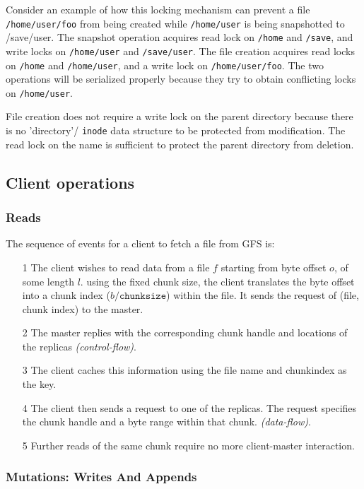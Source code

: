 \documentclass{article}
\begin{document}
Consider an example of how this locking mechanism can prevent a file \texttt{/home/user/foo} from being created while \texttt{/home/user} is being snapshotted to /save/user. The snapshot operation acquires read lock on  \texttt{/home} and \texttt{/save}, and write locks on \texttt{/home/user} and \texttt{/save/user}. The file creation acquires read locks on \texttt{/home} and \texttt{/home/user}, and a write lock
on \texttt{/home/user/foo}. The two operations will be serialized properly because they try to obtain conflicting locks on \texttt{/home/user}. 

File creation does not require a write lock on the parent directory because there is no 'directory'/ \texttt{inode} data structure to be protected from modification.  The read lock on the name is sufficient to protect the parent directory from deletion.

\subsection{Client operations}

\subsubsection{Reads}

The sequence of events for a client to fetch a file from GFS is:
\begin{itemize}
    \item[1]  The client wishes to read data from a file $f$ starting from byte offset $o$, of some length $l$. using the fixed chunk size, the client translates the byte offset into a chunk index ($b/\texttt{chunksize}$) within the file. It sends the request of (file, chunk index) to the master.
    \item[2]  The master replies with the corresponding chunk handle and locations of the replicas \emph{(control-flow)}.
    \item[3] The client caches this information using the file name and chunkindex as the key.
    \item[4] The client then sends a request to one of the replicas. The request specifies the chunk handle and a byte range within that chunk. \emph{(data-flow)}.
    \item[5] Further reads of the same chunk require no more client-master interaction.
\end{itemize}

\subsubsection{Mutations: Writes And Appends}
\end{document}
